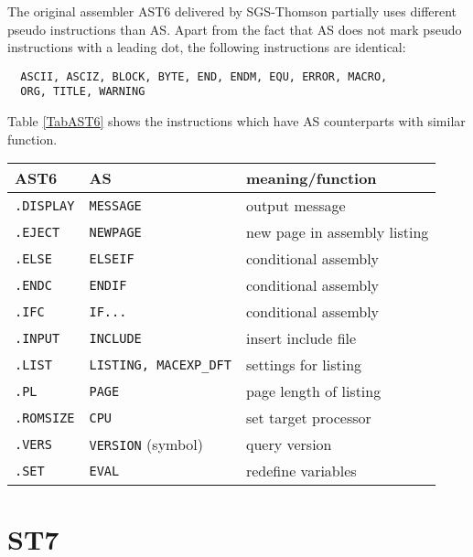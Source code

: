 \documentclass[12pt,twoside]{report}
\newcommand{\tty}[1]{{\tt #1}}
\newcommand{\asname}{{AS}}
\begin{document}
The original assembler AST6 delivered by SGS-Thomson partially uses
different pseudo instructions than \asname{}.  Apart from the fact that \asname{}
does not mark pseudo instructions with a leading dot, the following
instructions are identical:
\begin{verbatim}
  ASCII, ASCIZ, BLOCK, BYTE, END, ENDM, EQU, ERROR, MACRO,
  ORG, TITLE, WARNING
\end{verbatim}
Table \ref{TabAST6} shows the instructions which have \asname{} counterparts
with similar function.
\par
\begin{table*}[htbp]
\begin{center}\begin{tabular}{|l|l|l|}
\hline
AST6            & \asname{}                     & meaning/function \\
\hline
\hline
\tty{.DISPLAY}  & \tty{MESSAGE}          & output message \\
\hline
\tty{.EJECT}    & \tty{NEWPAGE}          & new page in assembly listing \\
\hline
\tty{.ELSE}     & \tty{ELSEIF}           & conditional assembly \\
\hline
\tty{.ENDC}     & \tty{ENDIF}            & conditional assembly \\
\hline
\tty{.IFC}      & \tty{IF...}            & conditional assembly \\
\hline
\tty{.INPUT}    & \tty{INCLUDE}          & insert include file \\
\hline
\tty{.LIST}     & \tty{LISTING, MACEXP\_DFT}  & settings for listing \\
\hline
\tty{.PL}       & \tty{PAGE}             & page length of listing \\
\hline
\tty{.ROMSIZE}  & \tty{CPU}              & set target processor \\
\hline
\tty{.VERS}     & \tty{VERSION} (symbol) & query version \\
\hline
\tty{.SET}      & \tty{EVAL}             & redefine variables \\
\hline
\end{tabular}\end{center}
\caption{Equivalent Instructions AST6$\leftrightarrow$\asname{}\label{TabAST6}}
\end{table*}


\section{ST7}
\end{document}
